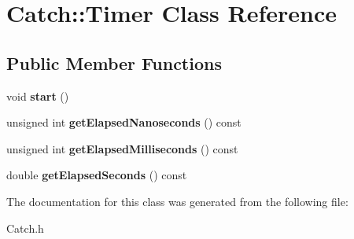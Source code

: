 \hypertarget{class_catch_1_1_timer}{\section{Catch\-:\-:Timer Class Reference}
\label{class_catch_1_1_timer}
}
\subsection*{Public Member Functions}
\begin{DoxyCompactItemize}
\item 
\hypertarget{class_catch_1_1_timer_a0a56e879e43f36c102bf9ea8b5fc8b72}{void {\bfseries start} ()}\label{class_catch_1_1_timer_a0a56e879e43f36c102bf9ea8b5fc8b72}

\item 
\hypertarget{class_catch_1_1_timer_ad88ea4dc75a07e5c6d870f5f979663a1}{unsigned int {\bfseries get\-Elapsed\-Nanoseconds} () const }\label{class_catch_1_1_timer_ad88ea4dc75a07e5c6d870f5f979663a1}

\item 
\hypertarget{class_catch_1_1_timer_a4cf3f9fbee9c76e87d989d9bc6913b68}{unsigned int {\bfseries get\-Elapsed\-Milliseconds} () const }\label{class_catch_1_1_timer_a4cf3f9fbee9c76e87d989d9bc6913b68}

\item 
\hypertarget{class_catch_1_1_timer_a8500ef3481a9bf6ae81337972d9f95a3}{double {\bfseries get\-Elapsed\-Seconds} () const }\label{class_catch_1_1_timer_a8500ef3481a9bf6ae81337972d9f95a3}

\end{DoxyCompactItemize}


The documentation for this class was generated from the following file\-:\begin{DoxyCompactItemize}
\item 
Catch.\-h\end{DoxyCompactItemize}
